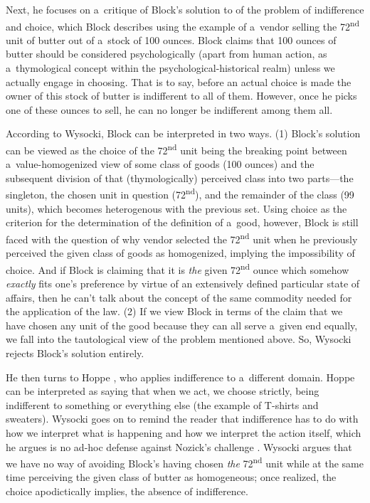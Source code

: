 Next, he focuses on a~critique of Block's solution to of the problem of indifference and choice, which Block 
\parencite*[][]{} %
 describes using the example of a~vendor selling the 72\textsuperscript{nd} unit of butter out of a~stock of 100 ounces. Block 
\parencite*[][]{} %
 claims that 100 ounces of butter should be considered psychologically (apart from human action, as a~thymological concept within the psychological-historical realm) unless we actually engage in choosing. That is to say, before an actual choice is made the owner of this stock of butter is indifferent to all of them. However, once he picks one of these ounces to sell, he can no longer be indifferent among them all.



According to Wysocki, Block 
\parencite*[][]{} %
 can be interpreted in two ways. (1) Block's solution can be viewed as the choice of the 72\textsuperscript{nd} unit being the breaking point between a~value-homogenized view of some class of goods (100 ounces) and the subsequent division of that (thymologically) perceived class into two parts---the singleton, the chosen unit in question (72\textsuperscript{nd}), and the remainder of the class (99 units), which becomes heterogenous with the previous set. Using choice as the criterion for the determination of the definition of a~good, however, Block is still faced with the question of why vendor selected the 72\textsuperscript{nd} unit when he previously perceived the given class of goods as homogenized, implying the impossibility of choice. And if Block is claiming that it is \textit{the} given 72\textsuperscript{nd} ounce which somehow \textit{exactly} fits one's preference by virtue of an extensively defined particular state of affairs, then he can't talk about the concept of the same commodity needed for the application of the law. (2) If we view Block in terms of the claim that we have chosen any unit of the good because they can all serve a~given end equally, we fall into the tautological view of the problem mentioned above. So, Wysocki rejects Block's solution entirely.



He then turns to Hoppe 
\parencite*[][]{}, %
 who applies indifference to a~different domain. Hoppe can be interpreted as saying that when we act, we choose strictly, being indifferent to something or everything else (the example of T-shirts and sweaters). Wysocki goes on to remind the reader that indifference has to do with how we interpret what is happening and how we interpret the action itself, which he argues is no ad-hoc defense against Nozick's challenge 
\parencite[][see footnote 27]{}. %
 Wysocki argues that we have no way of avoiding Block's having chosen \textit{the} 72\textsuperscript{nd} unit while at the same time perceiving the given class of butter as homogeneous; once realized, the choice apodictically implies, the absence of indifference.



